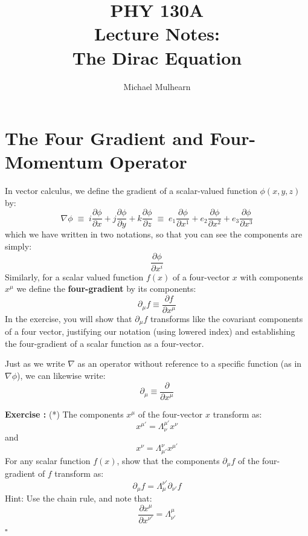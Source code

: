 \documentclass[12pt]{article}
\begin{document}
\setcounter{exercise}{0}

\newcommand{\exercise}{
\stepcounter{exercise}
\noindent
{\bf Exercise \theexercise:}
}



\title{PHY 130A \\ Lecture Notes: \\
The Dirac Equation }
\author{Michael Mulhearn}

\maketitle

\section{The Four Gradient and Four-Momentum Operator}

In vector calculus, we define the gradient of a scalar-valued function $\phi(x,y,z)$ by:
$$\nabla \phi \;\equiv\; i \frac{\partial \phi}{\partial x} + j \frac{\partial \phi}{\partial y} + k \frac{\partial \phi}{\partial z} \;\equiv\; e_1 \frac{\partial \phi}{\partial x^1} + e_2 \frac{\partial \phi}{\partial x^2} + e_3 \frac{\partial \phi}{\partial x^3}$$
which we have written in two notations, so that you can see the components are simply:
$$\frac{\partial \phi}{\partial x^i}$$
Similarly, for a scalar valued function $f(x)$ of a four-vector $x$ with components $x^\mu$ we define the {\bf four-gradient} by its components:
$$\partial_\mu f \equiv \frac{\partial f}{\partial x^\mu}$$
In the exercise, you will show that $\partial_\mu f$ transforms like
the covariant components of a four vector, justifying our notation
(using lowered index) and establishing the four-gradient of a scalar
function as a four-vector.

Just as we write $\nabla$ as an operator without reference to a
specific function (as in $\nabla \phi$), we can likewise write:
$$\partial_\mu \equiv \frac{\partial}{\partial x^\mu}$$

\exercise (*) The components $x^\mu$ of the four-vector $x$  transform as:
$$ x^{\mu'} = \Lambda^{\mu '}_{\nu} x^{\nu}$$
and
$$ x^{\nu} = \Lambda^{\nu}_{\mu'} x^{\mu'}$$
For any scalar function
$f(x)$, show that the components $\partial_\mu f$ of the four-gradient
of $f$ transform as:
$$\partial_\mu f =  \Lambda_{\mu}^{\nu'} \partial_{\nu'} f$$
Hint:  Use the chain rule, and note that:
$$\frac{\partial x^\mu}{\partial x^{\nu'}} = \Lambda^{\mu}_{\nu'}$$
$\square$\\[5pt]
\end{document}
